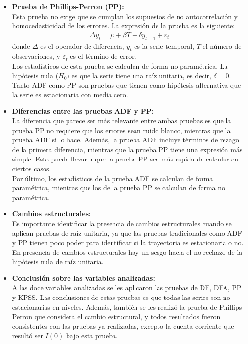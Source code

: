 \documentclass[12pt]{article}
\begin{document}
\begin{itemize}
    \item \textbf{Prueba de Phillips-Perron (PP):} \\
    Esta prueba no exige que se cumplan los supuestos de no autocorrelación y
    homocedasticidad de los errores. La expresión de la prueba es la siguiente:
    \begin{align}
        \Delta y_t = \mu + \beta T + \delta y_{t-1} + \varepsilon_t
    \end{align}
    donde $\Delta$ es el operador de diferencia, $y_t$ es la serie temporal,
    $T$ el número de observaciones, y $\varepsilon_t$ es el término de error.\\
    Los estadísticos de esta prueba se calculan de forma no paramétrica. La hipótesis nula ($H_0$) es que la serie tiene una raíz
    unitaria, es decir, $\delta=0$.\\
    Tanto ADF como PP son pruebas que tienen como hipótesis alternativa 
    que la serie es estacionaria con media cero.

    \item \textbf{Diferencias entre las pruebas ADF y PP:} \\
    La diferencia que parece ser más relevante entre ambas pruebas es que la prueba PP
    no requiere que los errores sean ruido blanco, mientras que la prueba ADF sí lo hace.
    Además, la prueba ADF incluye términos de rezago de la primera diferencia, 
    mientras que la prueba PP tiene una expresión más simple. Esto puede llevar
    a que la prueba PP sea más rápida de calcular en ciertos casos.\\
    Por último, los estadísticos de la prueba ADF se calculan de forma paramétrica, mientras que
    los de la prueba PP se calculan de forma no paramétrica.\\

    \item \textbf{Cambios estructurales:}\\
    Es importante identificar la presencia de cambios estructurales cuando 
    se aplican pruebas de raíz unitaria, ya que las pruebas tradicionales como ADF y PP
    tienen poco poder para identificar si la trayectoria es estacionaria o no. 
    En presencia de cambios estructurales hay un sesgo hacia el no rechazo 
    de la hipótesis nula de raíz unitaria.

    \item \textbf{Conclusión sobre las variables analizadas:}\\
    A las doce variables analizadas se les aplicaron las pruebas de DF, DFA, PP y KPSS.
    Las conclusiones de estas pruebas es que todas las series son no estacionarias en niveles. 
    Además, también se les realizó la prueba de Phillips-Perron que considera el cambio
    estructural, y todos resultados fueron consistentes con las pruebas ya realizadas, excepto
    la cuenta corriente que resultó ser $I(0)$ bajo esta prueba.
    
\end{itemize}



\printbibliography
\nocite{*}

\end{document}
